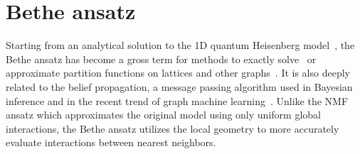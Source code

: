 \section{Bethe ansatz}
\label{sec:bethe}

Starting from an analytical solution to the 1D quantum Heisenberg model~\cite{bethe1931theorie}, the Bethe ansatz has become a gross term for methods to exactly solve~\cite{baxter1995solvable, caravelli2022some} or approximate partition functions on lattices and other graphs~\cite{gujrati1995bethe, mezard2001bethe}. It is also deeply related to the belief propagation, a message passing algorithm used in Bayesian inference and in the recent trend of graph machine learning~\cite{yedidia2003understanding, ikeda2004stochastic}. Unlike the NMF ansatz which approximates the original model using only uniform global interactions, the Bethe ansatz utilizes the local geometry to more accurately evaluate interactions between nearest neighbors.

